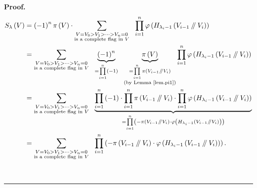 \documentclass[numbers=enddot,12pt,final,onecolumn,notitlepage]{scrartcl}%
\numberwithin{exer}{section}
\theoremstyle{definition}
\newenvironment{proof}[1][Proof]{\noindent\textbf{#1.} }{\ \rule{0.5em}{0.5em}}
\let\sumnonlimits\sum
\let\prodnonlimits\prod
\renewcommand{\sum}{\sumnonlimits\limits}
\renewcommand{\prod}{\prodnonlimits\limits}
\newcommand{\sslash}{\mathbin{/\mkern-5mu/}}
\theoremstyle{plainsl}
\begin{document}
\begin{proof}
\begin{align*}
S_{\lambda}\left(  V\right)   &  =\left(  -1\right)  ^{n}\pi\left(  V\right)
\cdot\sum_{\substack{V=V_{0}>V_{1}>\cdots>V_{n}=0\\\text{is a complete flag in
}V}}\ \ \prod_{i=1}^{n}\varphi\left(  H_{\lambda_{i}-1}\left(  V_{i-1}%
\sslash V_{i}\right)  \right) \\
&  =\sum_{\substack{V=V_{0}>V_{1}>\cdots>V_{n}=0\\\text{is a complete flag in
}V}}\ \ \underbrace{\left(  -1\right)  ^{n}}_{=\prod_{i=1}^{n}\left(
-1\right)  }\ \ \underbrace{\pi\left(  V\right)  }_{\substack{=\prod_{i=1}%
^{n}\pi\left(  V_{i-1}\sslash V_{i}\right)  \\\text{(by Lemma \ref{lem.pi1})}%
}}\prod_{i=1}^{n}\varphi\left(  H_{\lambda_{i}-1}\left(  V_{i-1}%
\sslash V_{i}\right)  \right) \\
&  =\sum_{\substack{V=V_{0}>V_{1}>\cdots>V_{n}=0\\\text{is a complete flag in
}V}}\ \ \underbrace{\prod_{i=1}^{n}\left(  -1\right)  \cdot\prod_{i=1}^{n}%
\pi\left(  V_{i-1}\sslash V_{i}\right)  \cdot\prod_{i=1}^{n}\varphi\left(
H_{\lambda_{i}-1}\left(  V_{i-1}\sslash V_{i}\right)  \right)  }_{=\prod
_{i=1}^{n}\left(  -\pi\left(  V_{i-1}\sslash V_{i}\right)  \cdot\varphi\left(
H_{\lambda_{i}-1}\left(  V_{i-1}\sslash V_{i}\right)  \right)  \right)  }\\
&  =\sum_{\substack{V=V_{0}>V_{1}>\cdots>V_{n}=0\\\text{is a complete flag in
}V}}\ \ \prod_{i=1}^{n}\left(  -\pi\left(  V_{i-1}\sslash V_{i}\right)
\cdot\varphi\left(  H_{\lambda_{i}-1}\left(  V_{i-1}\sslash V_{i}\right)
\right)  \right)  .
\end{align*}



\end{proof}
\end{document}
